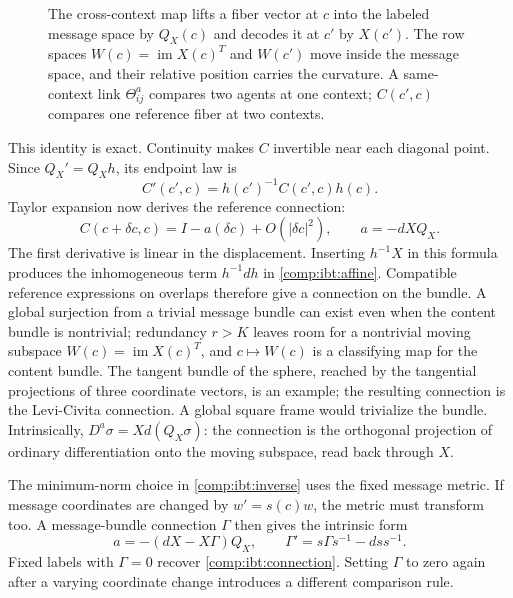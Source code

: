 \begin{figure}[htbp]
\centering

\caption{The cross-context map lifts a fiber vector at $c$ into the labeled message space by $Q_X(c)$ and decodes it at $c'$ by $X(c')$. The row spaces $W(c)=\operatorname{im}X(c)^T$ and $W(c')$ move inside the message space, and their relative position carries the curvature. A same-context link $\Theta_{ij}^a$ compares two agents at one context; $C(c',c)$ compares one reference fiber at two contexts.}
\label{fig:comp-cross-context}
\end{figure}

This identity is exact. Continuity makes $C$ invertible near each diagonal point. Since $Q_X'=Q_Xh$, its endpoint law is
\begin{equation}
C'(c',c)=h(c')^{-1}C(c',c)h(c).
\end{equation}
Taylor expansion now derives the reference connection:
\begin{equation}
C(c+\delta c,c)=I-a(\delta c)+O(|\delta c|^2),\qquad
a=-dXQ_X.
\label{comp:ibt:connection}
\end{equation}
The first derivative is linear in the displacement. Inserting $h^{-1}X$ in this formula produces the inhomogeneous term $h^{-1}dh$ in \cref{comp:ibt:affine}. Compatible reference expressions on overlaps therefore give a connection on the bundle. A global surjection from a trivial message bundle can exist even when the content bundle is nontrivial; redundancy $r>K$ leaves room for a nontrivial moving subspace $W(c)=\operatorname{im}X(c)^T$, and $c\mapsto W(c)$ is a classifying map for the content bundle. The tangent bundle of the sphere, reached by the tangential projections of three coordinate vectors, is an example; the resulting connection is the Levi-Civita connection. A global square frame would trivialize the bundle. Intrinsically, $D^a\sigma=Xd(Q_X\sigma)$: the connection is the orthogonal projection of ordinary differentiation onto the moving subspace, read back through $X$.

The minimum-norm choice in \cref{comp:ibt:inverse} uses the fixed message metric. If message coordinates are changed by $w'=s(c)w$, the metric must transform too. A message-bundle connection $\Gamma$ then gives the intrinsic form
\begin{equation}
a=-(dX-X\Gamma)Q_X,\qquad
\Gamma'=s\Gamma s^{-1}-ds s^{-1}.
\end{equation}
Fixed labels with $\Gamma=0$ recover \cref{comp:ibt:connection}. Setting $\Gamma$ to zero again after a varying coordinate change introduces a different comparison rule.

